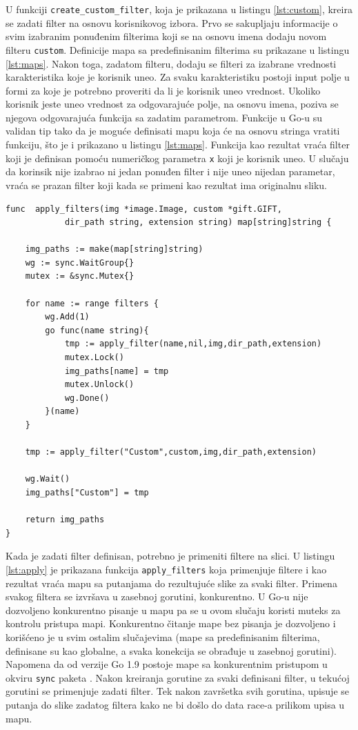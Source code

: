 \documentclass[12pt,oneside]{memoir}
\begin{document}
 U funkciji  \texttt{create\_custom\_filter}, koja je prikazana u listingu \ref{lst:custom}, kreira se zadati filter na osnovu korisnikovog izbora. Prvo se sakupljaju informacije o svim izabranim ponuđenim filterima koji se na osnovu imena dodaju novom filteru  \texttt{custom}. Definicije mapa sa predefinisanim filterima su prikazane u listingu \ref{lst:maps}. Nakon toga, zadatom filteru, dodaju se filteri za izabrane vrednosti karakteristika koje je korisnik uneo. Za svaku karakteristiku postoji input polje u formi za koje je potrebno proveriti da li je korisnik uneo vrednost. Ukoliko korisnik jeste uneo vrednost za odgovarajuće polje, na osnovu imena, poziva se njegova odgovarajuća funkcija sa zadatim parametrom. Funkcije u Go-u su validan tip tako da je moguće definisati mapu koja će na osnovu stringa vratiti funkciju, što je i prikazano u listingu \ref{lst:maps}. Funkcija kao rezultat vraća filter koji je definisan pomoću numeričkog parametra  \texttt{x} koji je korisnik uneo. U slučaju da korinsik nije izabrao ni jedan ponuđen filter i nije uneo nijedan parametar, vraća se prazan filter koji kada se primeni kao rezultat ima originalnu sliku.

\begin{center}
\begin{lstlisting}[caption=Funkcija za paralelnu primenu filtera,label={lst:apply},  backgroundcolor=\color{background}]
func  apply_filters(img *image.Image, custom *gift.GIFT, 
			dir_path string, extension string) map[string]string {

	img_paths := make(map[string]string)
	wg := sync.WaitGroup{}
	mutex := &sync.Mutex{}

	for name := range filters {
		wg.Add(1)
		go func(name string){
			tmp := apply_filter(name,nil,img,dir_path,extension)
			mutex.Lock()
			img_paths[name] = tmp
			mutex.Unlock()
			wg.Done()
		}(name)
	}

	tmp := apply_filter("Custom",custom,img,dir_path,extension)

	wg.Wait()
	img_paths["Custom"] = tmp

	return img_paths
}
\end{lstlisting}
\end{center}

Kada je zadati filter definisan, potrebno je primeniti filtere na slici. U listingu \ref{lst:apply} je prikazana funkcija  \texttt{apply\_filters} koja primenjuje filtere i kao rezultat vraća mapu sa putanjama do rezultujuće slike za svaki filter. Primena svakog filtera se izvršava u zasebnoj gorutini, konkurentno. U Go-u nije dozvoljeno konkurentno pisanje u mapu pa se u ovom slučaju koristi muteks za kontrolu pristupa mapi. Konkurentno čitanje mape bez pisanja je dozvoljeno i korišćeno je u svim ostalim slučajevima (mape sa predefinisanim filterima, definisane su kao globalne, a svaka konekcija se obrađuje u zasebnoj gorutini). Napomena da od verzije Go 1.9 postoje mape sa konkurentnim pristupom u okviru \texttt{sync} paketa \cite{sync}. Nakon kreiranja gorutine za svaki definisani filter, u tekućoj gorutini se primenjuje zadati filter. Tek nakon završetka svih gorutina, upisuje se putanja do slike zadatog filtera kako ne bi došlo do data race-a prilikom upisa u mapu. 
\end{document}
